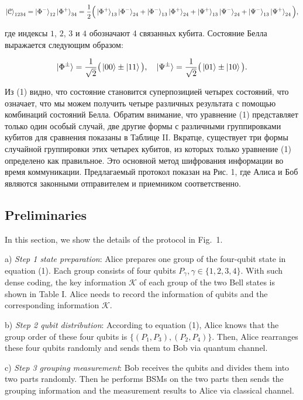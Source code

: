 \documentclass[a4paper,11pt]{article}
\begin{document}
\begin{equation*}
\ket{\mathcal{C}}_{1234} = \ket{\Phi^-}_{12} \ket{\Phi^+}_{34}
= \dfrac{1}{2} \Big(\ket{\Phi^+}_{13} \ket{\Phi^-}_{24} + 
 					\ket{\Phi^-}_{13} \ket{\Phi^+}_{24} +
 					\ket{\Psi^+}_{13} \ket{\Psi^-}_{24} +
 					\ket{\Psi^-}_{13} \ket{\Psi^+}_{24} \Big),
\end{equation*}

где индексы $1$, $2$, $3$ и $4$ обозначают 4 связанных кубита. Состояние Белла выражается следующим образом:

\begin{equation*}
\ket{\Phi^{\pm}} = \dfrac{1}{\sqrt2}\big(\ket{00} \pm \ket{11} \big), \quad
\ket{\Psi^{\pm}} = \dfrac{1}{\sqrt2}\big(\ket{01} \pm \ket{10} \big).
\end{equation*}


Из (1) видно, что состояние становится суперпозицией четырех состояний, что означает, что мы можем получить четыре различных результата с помощью комбинаций состояний Белла. Обратим внимание, что уравнение (1) представляет только один особый случай, две другие формы с различными группировками кубитов для сравнения показаны в Таблице II. Вкратце, существует три формы случайной группировки этих четырех кубитов, из которых только уравнение (1) определено как правильное. Это основной метод шифрования информации во время коммуникации. Предлагаемый протокол показан на Рис. 1, где Алиса и Боб являются законными отправителем и приемником соответственно.

\subsection{Preliminaries}
In this section, we show the details of the protocol in Fig.~1.

a) \textit{Step 1 state preparation}: Alice prepares one group of the four-qubit state in equation (1). Each group consists of four qubits $P_\gamma, \gamma \in \{1,2,3,4\}$. With such dense coding, the key information $\mathcal{K}$ of each group of the two Bell states is shown in Table I. Alice needs to record the information of qubits and the corresponding information $\mathcal{K}$.

b) \textit{Step 2 qubit distribution}: According to equation (1), Alice knows that the group order of these four qubits is $\{(P_1, P_3), (P_2, P_4)\}$. Then, Alice rearranges these four qubits randomly and sends them to Bob via quantum channel.

c) \textit{Step 3 grouping measurement}: Bob receives the qubits and divides them into two parts randomly. Then he performs BSMs on the two parts then sends the grouping information and the measurement results to Alice via classical channel.
\end{document}
